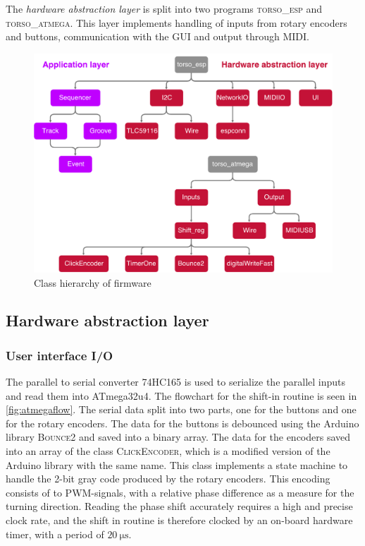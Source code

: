 The \textit{hardware abstraction layer} is split into two programs \textsc{torso\_esp} and \textsc{torso\_atmega}. This layer implements handling of inputs from rotary encoders and buttons, communication with the GUI and output through MIDI.


\begin{figure}[h]
    \centering
    \includegraphics[width=\textwidth]{graphics/firmware_overview.pdf}
    \caption{Class hierarchy of firmware }
    \label{fig:firmware}
\end{figure}

\subsection{Hardware abstraction layer}
\label{sec:harwarelayer}

\subsubsection{User interface I/O}
\label{sec:userinterfaceio}
The parallel to serial converter \textsc{74HC165} is used to serialize the parallel inputs and read them into ATmega32u4. The flowchart for the shift-in routine is seen in \cref{fig:atmegaflow}. The serial data split into two parts, one for the buttons and one for the rotary encoders. The data for the buttons is debounced using the Arduino library \textsc{Bounce2} and saved into a binary array. The data for the encoders saved into an array of the class \textsc{ClickEncoder}, which is a modified version of the Arduino library with the same name. This class implements a state machine to handle the 2-bit gray code produced by the rotary encoders. This encoding consists of to PWM-signals, with a relative phase difference as a measure for the turning direction. Reading the phase shift accurately requires a high and precise clock rate, and the shift in routine is therefore clocked by an on-board hardware timer, with a period of  $\SI{20}{\micro\second}$.

